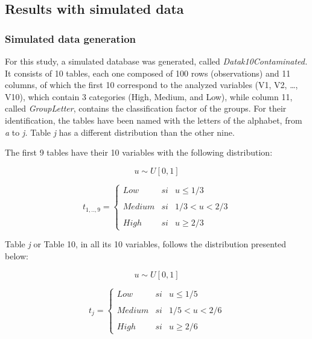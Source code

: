 \documentclass[mathematics,article,submit,moreauthors,pdftex]{mdpi}
\begin{document}
\hypertarget{results-with-simulated-data}{%
\subsection{Results with simulated
data}\label{results-with-simulated-data}}

\hypertarget{simulated-data-generation}{%
\subsubsection{Simulated data
generation}\label{simulated-data-generation}}

\label{simulados}

For this study, a simulated database was generated, called
\emph{Datak10Contaminated.} It consists of 10 tables, each one composed
of 100 rows (observations) and 11 columns, of which the first 10
correspond to the analyzed variables (V1, V2, \ldots, V10), which
contain 3 categories (High, Medium, and Low), while column 11, called
\emph{GroupLetter}, contains the classification factor of the groups.
For their identification, the tables have been named with the letters of
the alphabet, from \emph{a} to \emph{j.} Table \emph{j} has a different
distribution than the other nine.

The first 9 tables have their 10 variables with the following
distribution:

\[ u \sim U[0,1]\]

\[t_{1,..,9}= \left\{ \begin{array}{lcc}
             Low &   si  & u \leq 1/3 \\
             \\ Medium &  si & 1/3 < u < 2/3 \\
             \\ High &  si  & u \geq 2/3 
             \end{array}
   \right. \]

Table \emph{j} or Table 10, in all its 10 variables, follows the
distribution presented below:

\[ u \sim U[0,1]\]

\[t_{j}= \left\{ \begin{array}{lcc}
             Low &   si  & u \leq 1/5 \\
             \\ Medium &  si & 1/5 < u < 2/6 \\
             \\ High &  si  & u \geq 2/6 
             \end{array}
   \right. \]
\end{document}

